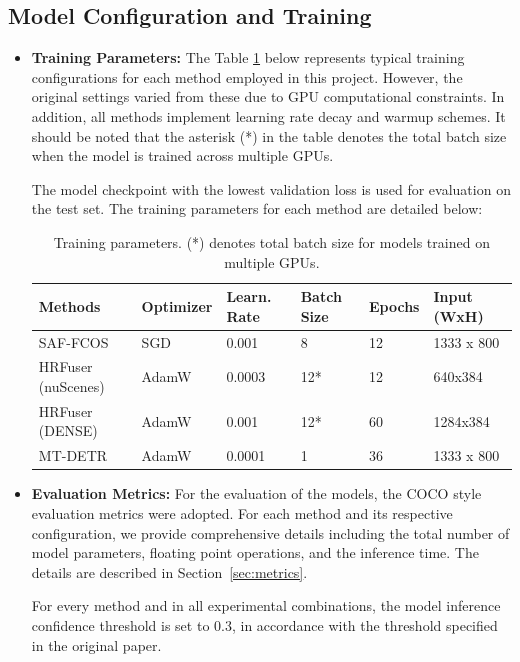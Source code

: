 \documentclass[report.tex]{subfiles}
\begin{document}
        \subsection{Model Configuration and Training}
        \begin{itemize}
            
            \item \textbf{Training Parameters:} The Table \ref{tab:experiment_training_parameters} below represents typical training configurations for each method employed in this project. However, the original settings varied from these due to GPU computational constraints. In addition, all methods implement learning rate decay and warmup schemes. It should be noted that the asterisk (*) in the table denotes the total batch size when the model is trained across multiple GPUs.
            
            The model checkpoint with the lowest validation loss is used for evaluation on the test set. The training parameters for each method are detailed below:

            \begin{table}[h]
                \centering
                \caption{Training parameters. (*) denotes total batch size for models trained on multiple GPUs.}
                \begin{tabular}{|l|l|l|l|l|l|}
                \hline
                \textbf{Methods} & \textbf{Optimizer} & \textbf{Learn. Rate} & \textbf{Batch Size} & \textbf{Epochs} & \textbf{Input (WxH)} \\ \hline
                SAF-FCOS         & SGD                & 0.001                & 8                   & 12              & 1333 x 800           \\ \hline
                HRFuser (nuScenes) & AdamW             & 0.0003               & 12*                 & 12              & 640x384              \\ \hline
                HRFuser (DENSE)    & AdamW             & 0.001                & 12*                 & 60              & 1284x384             \\ \hline
                MT-DETR            & AdamW             & 0.0001               & 1                   & 36              & 1333 x 800           \\ \hline
                \end{tabular}
                \label{tab:experiment_training_parameters}
            \end{table}
            
            
            \item \textbf{Evaluation Metrics:} For the evaluation of the models, the COCO style evaluation metrics were adopted. For each method and its respective configuration, we provide comprehensive details including the total number of model parameters, floating point operations, and the inference time. The details are described in Section~\ref{sec:metrics}.
            
            For every method and in all experimental combinations, the model inference confidence threshold is set to 0.3, in accordance with the threshold specified in the original paper.
        \end{itemize}
\end{document}
